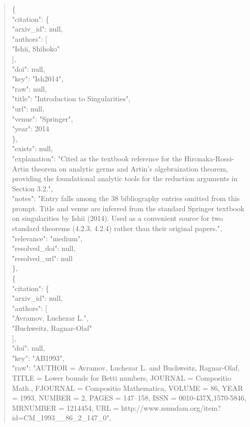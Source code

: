 \documentclass[11pt]{article}
\begin{document}
\begin{quote}
    \{\\
      "citation": \{\\
        "arxiv\_id": null,\\
        "authors": [\\
          "Ishii, Shihoko"\\
        ],\\
        "doi": null,\\
        "key": "Ish2014",\\
        "raw": null,\\
        "title": "Introduction to Singularities",\\
        "url": null,\\
        "venue": "Springer",\\
        "year": 2014\\
      \},\\
      "exists": null,\\
      "explanation": "Cited as the textbook reference for the Hironaka-Rossi-Artin theorem on analytic germs and Artin's algebraization theorem, providing the foundational analytic tools for the reduction arguments in Section 3.2.",\\
      "notes": "Entry falls among the 38 bibliography entries omitted from this prompt. Title and venue are inferred from the standard Springer textbook on singularities by Ishii (2014). Used as a convenient source for two standard theorems (4.2.3, 4.2.4) rather than their original papers.",\\
      "relevance": "medium",\\
      "resolved\_doi": null,\\
      "resolved\_url": null\\
    \},\\
    \{\\
      "citation": \{\\
        "arxiv\_id": null,\\
        "authors": [\\
          "Avramov, Luchezar L.",\\
          "Buchweitz, Ragnar-Olaf"\\
        ],\\
        "doi": null,\\
        "key": "AB1993",\\
        "raw": "AUTHOR = Avramov, Luchezar L. and Buchweitz, Ragnar-Olaf, TITLE = Lower bounds for Betti numbers, JOURNAL = Compositio Math., FJOURNAL = Compositio Mathematica, VOLUME = 86, YEAR = 1993, NUMBER = 2, PAGES = 147--158, ISSN = 0010-437X,1570-5846, MRNUMBER = 1214454, URL = http://www.numdam.org/item?id=CM\_1993\_\_86\_2\_147\_0",\\

\end{quote}
\end{document}
